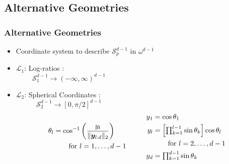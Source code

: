 \documentclass[aspectratio=169]{beamer}
\begin{document}
\subsection{Alternative Geometries}

\begin{frame}
  \frametitle{Alternative Geometries}
  \small
  \begin{itemize}
    \item Coordinate system to describe $\mathcal{S}_p^{d-1}$ in $\omega^{d-1}$
    \item $\mathcal{L}_1$: Log-ratios \citep{aitchison1982}:
        \begin{equation*}
            \mathcal{S}_1^{d-1} \rightarrow (-\infty,\infty)^{d-1}\hspace{8cm}~
        \end{equation*}
    \item $\mathcal{L}_2$: Spherical Coordinates \citep{nunez2019}: 
        \begin{equation*}
            \mathcal{S}_2^{d-1} \rightarrow [0,\pi/2]^{d-1}\hspace{8cm}~
        \end{equation*}
        \vspace{-0.5cm}
      \begin{equation*}
        \begin{aligned}
        \theta_l &= \cos^{-1}\left(\frac{y_l}{\lVert \bm{y}_{l:d}\rVert_2}\right)\\
        &\hspace{0.75cm}\text{for }l = 1,\ldots,d-1
        \end{aligned}
        \hspace{1cm}
        \begin{aligned}
          y_1 &= \cos\theta_1\\
          y_l &= \left[{\textstyle\prod}_{k = 1}^{l-1}\sin\theta_k\right]\cos\theta_l\\
          &\hspace{0.75cm}\text{for }l = 2,\ldots,d-1\\
          y_d &= {\textstyle\prod}_{k = 1}^{d-1}\sin\theta_k
        \end{aligned}
      \end{equation*}
  \end{itemize}
\end{frame}
\end{document}
